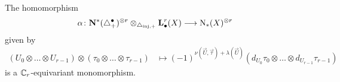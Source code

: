 \begin{lemma}
	The homomorphism
	\[\alpha\colon \mathbf{N}^*(\triangle_{+}^\bullet)^{\otimes r}\otimes_{\triangle_{\mathrm{inj},+}} \operatorname{\mathbf{L}}^r_\bullet(X)\longrightarrow \operatorname{N}_*(X)^{\otimes r}\]
	given by
	\begin{align*}
		(U_0\otimes \ldots\otimes U_{r-1})\otimes (\tau_0\otimes\ldots\otimes \tau_{r-1}) %
		&\mapsto (-1)^{ \nu(\vec{U},\vec{\tau})+ \lambda(\vec{U})}(d_{U_0}\tau_0\otimes \ldots\otimes d_{U_{r-1}}\tau_{r-1})
	\end{align*}
	is a $\mathbb{C}_r$-equivariant monomorphism. %
\end{lemma}


